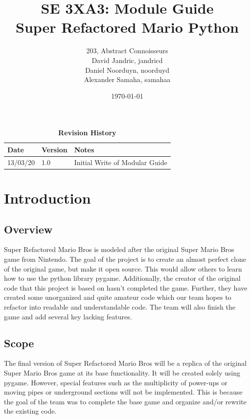 \documentclass[12pt, titlepage]{article}
\title{SE 3XA3: Module Guide\\Super Refactored Mario Python}
\author{203, Abstract Connoisseurs 
		\\ David Jandric, jandricd
		\\ Daniel Noorduyn, noorduyd
		\\ Alexander Samaha, samahaa
}
\date{\today}
\begin{document}
\maketitle

\tableofcontents
\listoftables
\listoffigures

\begin{table}[btp]
\caption{\bf Revision History}
\begin{tabularx}{\textwidth}{p{3cm}p{2cm}X}
\toprule {\bf Date} & {\bf Version} & {\bf Notes}\\
\midrule
13/03/20 & 1.0 & Initial Write of Modular Guide\\
\bottomrule
\end{tabularx}
\end{table}

\clearpage


\section{Introduction}

\subsection{Overview}

Super Refactored Mario Bros is modeled after the original Super Mario Bros game from Nintendo. The goal of the project is to create an almost perfect clone of the original game, but make it open source. This would allow others to learn how to use the python library pygame. Additionally, the creator of the original code that this project is based on hasn't completed the game. Further, they have created some unorganized and quite amateur code which our team hopes to refactor into readable and understandable code. The team will also finish the game and add several key lacking features. 

\subsection{Scope}

The final version of Super Refactored Mario Bros will be a replica of the original Super Mario Bros game at its base functionality. It will be created solely using pygame. However, special features such as the multiplicity of power-ups or moving pipes or underground sections will not be implemented. This is because the goal of the team was to complete the base game and organize and/or rewrite the existing code.
\end{document}
